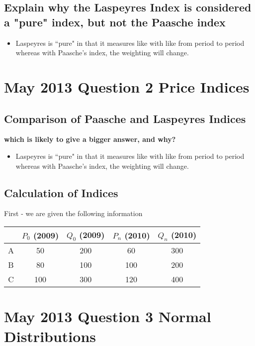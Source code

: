 \documentclass[12pts]{article}
\begin{document}
\subsection*{Explain why the Laspeyres Index is considered a "pure" index, but not the Paasche index}
\begin{itemize}
\item Laspeyres is ``pure" in that it measures like with like from period to period whereas with Paasche's index, the weighting will change.
\end{itemize}
\section*{May 2013 Question 2 Price Indices}

\subsection*{Comparison of Paasche and Laspeyres Indices}

\textbf{which is likely to give a bigger answer, and why?}\\

\begin{itemize}
\item Laspeyres is ``pure" in that it measures like with like from period to period whereas with Paasche's index, the weighting will change.
\end{itemize}
\subsection*{Calculation of Indices}
First - we are given the following information
\begin{center}
\begin{tabular}{|c|c|c|c|c|}
\hline \rule[-2ex]{0pt}{5.5ex}  & $P_0$ (2009) & $Q_0$ (2009) & $P_n$ (2010) & $Q_n$ (2010) \\ 
\hline \rule[-2ex]{0pt}{5.5ex} A & 50 & 200 & 60 & 300 \\ 
\hline \rule[-2ex]{0pt}{5.5ex} B & 80 & 100 & 100 & 200 \\ 
\hline \rule[-2ex]{0pt}{5.5ex} C & 100 & 300 & 120 & 400 \\ 
\hline 
\end{tabular} 
\end{center}

\section*{May 2013 Question 3 Normal Distributions}
\end{document}
